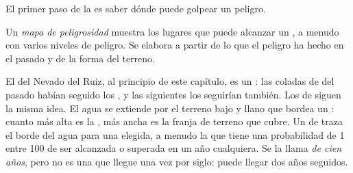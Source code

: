 El primer paso de la  es saber dónde puede golpear un peligro.

\begin{definition}\label{def:g9:natural-risks:hazard-map}
Un \emph{mapa de peligrosidad} muestra los
lugares que puede alcanzar un , a menudo con varios niveles
de peligro. Se elabora a partir de lo que el peligro ha hecho en el pasado
y de la forma del terreno.
\end{definition}

El  del Nevado del Ruiz, al principio de este capítulo, es un : las coladas de  del pasado habían seguido los , y
las siguientes los seguirían también. Los  de  siguen la
misma idea. El agua se extiende por el terreno bajo y llano que bordea un
: cuanto más alta es la , más ancha es la franja de terreno que
cubre. Un  de  traza el borde del agua para una 
elegida, a menudo la que tiene una probabilidad de 1 entre 100 de ser
alcanzada o superada en un año cualquiera. Se la llama \emph{ de
cien años}, pero no es una  que llegue una vez por siglo: puede
llegar dos años seguidos.

